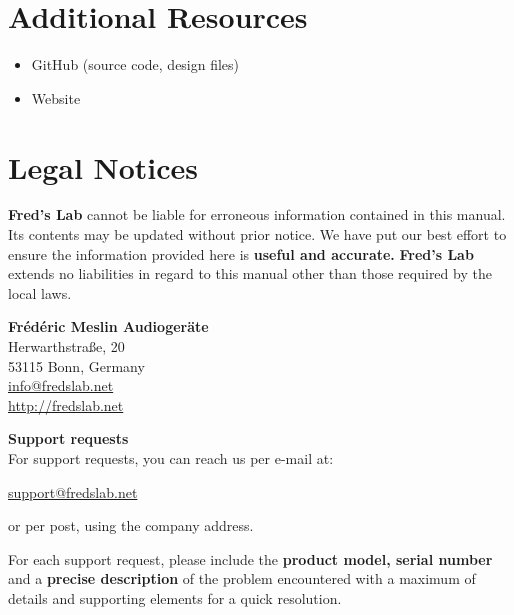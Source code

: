 \documentclass{scrartcl}
\begin{document}
\section{Additional Resources}

\begin{itemize}
    \item GitHub (source code, design files)
    \item Website
\end{itemize}

\pagebreak


\section{Legal Notices}

\textbf{Fred's Lab} cannot be liable for erroneous information contained in this manual. Its contents may be updated without prior notice. We have put our best effort to ensure the information provided here is \textbf{useful and accurate.} \textbf{Fred's Lab} extends no liabilities in regard to this manual other than those required by the local laws.

\vspace{0.25cm}
\begin{center}
    \textbf{Frédéric Meslin Audiogeräte} \\
    Herwarthstraße, 20 \\
    53115 Bonn, Germany \\
    \url{info@fredslab.net} \\
    \url{http://fredslab.net} \\
\end{center}

\vspace{0.25cm}
\textbf{Support requests} \\
For support requests, you can reach us per e-mail at:
\begin{center}
    \url{support@fredslab.net}
\end{center}
or per post, using the company address.

For each support request, please include the \textbf{product model, serial number} and a \textbf{precise description} of the problem encountered with a maximum of details and supporting elements for a quick resolution.
\end{document}
